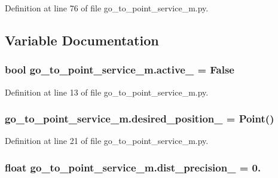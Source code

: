 Definition at line 76 of file go\+\_\+to\+\_\+point\+\_\+service\+\_\+m.\+py.



\subsection{Variable Documentation}
\subsubsection[{\texorpdfstring{active\+\_\+}{active_}}]{\setlength{\rightskip}{0pt plus 5cm}bool go\+\_\+to\+\_\+point\+\_\+service\+\_\+m.\+active\+\_\+ = False}\hypertarget{namespacego__to__point__service__m_a0a0a9847f2d5f0059f48709cba4df15c}{}\label{namespacego__to__point__service__m_a0a0a9847f2d5f0059f48709cba4df15c}


Definition at line 13 of file go\+\_\+to\+\_\+point\+\_\+service\+\_\+m.\+py.

\subsubsection[{\texorpdfstring{desired\+\_\+position\+\_\+}{desired_position_}}]{\setlength{\rightskip}{0pt plus 5cm}go\+\_\+to\+\_\+point\+\_\+service\+\_\+m.\+desired\+\_\+position\+\_\+ = Point()}\hypertarget{namespacego__to__point__service__m_a5e4a4244e883c27be9ed897ea5460cc0}{}\label{namespacego__to__point__service__m_a5e4a4244e883c27be9ed897ea5460cc0}


Definition at line 21 of file go\+\_\+to\+\_\+point\+\_\+service\+\_\+m.\+py.

\subsubsection[{\texorpdfstring{dist\+\_\+precision\+\_\+}{dist_precision_}}]{\setlength{\rightskip}{0pt plus 5cm}float go\+\_\+to\+\_\+point\+\_\+service\+\_\+m.\+dist\+\_\+precision\+\_\+ = 0.}\hypertarget{namespacego__to__point__service__m_a15a85217148ccc92490d2ec8366dfbd4}{}\label{namespacego__to__point__service__m_a15a85217148ccc92490d2ec8366dfbd4}


